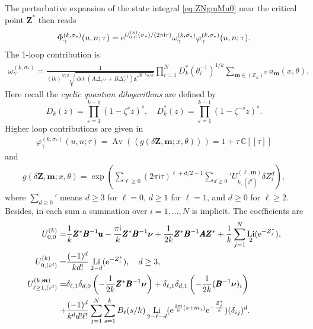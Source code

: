 \documentclass[a4paper,11pt]{article}	%
\DeclareMathOperator{\Li}{Li}
\newcommand{\bs}[1]{\boldsymbol{#1}}
\def\IC{\mathbb{C}}
\def\IZ{\mathbb{Z}}
\def\vev#1{\left\langle #1 \right\rangle}
\newcommand{\re}{{\rm e}}
\newcommand{\ri}{{\mathsf{i}}}
\newcommand{\nn}{\nonumber \\}
\begin{document}
The perturbative expansion of the state integral \eqref{eq:ZNgmMu0}
near the critical point $\pmb{Z}^*$ then reads
\begin{align}
  \Phi_\gamma^{(k,\sigma_*)}(u,n;\tau) = %
  \re^{U^{(k)}_{0,0}(\sigma_*)/(2\pi\ri\tau)}
  \omega_{\gamma}^{(k,\sigma_*)}\varphi_{\gamma}^{(k,\sigma_*)}(u,n;\tau).
  \label{eq:Zpert}
\end{align}
The 1-loop contribution is
\begin{align}
  \omega_{\gamma}^{(k,\sigma_*)} = \frac{1}
  {(\ri k)^{N/2}\sqrt{\det(A\Delta_{{z^*}''}+B\Delta_{z^*}^{-1})
  {\pmb{z}^*}^{\pmb{B}^{-1}\pmb{\nu}/k}
  }}
  \prod_{i=1}^N D_k^*(\theta_i^{-1})^{1/k} \sum_{\pmb{m}\in(\IZ_k)^N}
  a_{\pmb{m}}(x,\theta).
  \label{eq:omega}
\end{align}
Here recall the \emph{cyclic quantum dilogarithms} are defined by
\begin{equation}
  D_k(z) = \prod_{s=1}^{k-1}(1-\zeta^s z)^s,\quad
  D_{k}^*(z) = \prod_{s=1}^{k-1}(1-\zeta^{-s}z)^s.
\end{equation}
Higher loop contributions are given in
\begin{align}
  \varphi_{\gamma}^{(k,\sigma_*)}(u,n;\tau) =
  \mathop{\text{Av}}\left(
  \vev{
  g(\delta \pmb{Z},\pmb{m};x,\theta)
  }
  \right) = 1 + \tau \,\IC[[\tau]]
  \label{eq:varphi}
\end{align}
and
\begin{align}
  g(\delta \pmb{Z},\pmb{m};x,\theta) =
  \exp\left(
  \sum_{\ell\geq 0}(2\pi\ri\tau)^{\ell+d/2-1}
  {\sum_{d\geq  0}}'U_{k,(i^d)}^{(\ell,\pmb{m})}\delta Z_i^d\right),
\end{align}
where ${\sum_{d\geq 0}}'$ means $d\geq 3$ for $\ell=0$, $d\geq 1$ for
$\ell =1$, and $d\geq 0$ for $\ell\geq 2$.  Besides, in each sum a
summation over $i=1,\ldots,N$ is implicit.  The coefficients are
\begin{subequations}
  \begin{align}
    U^{(k)}_{0,0} =
    &\frac{1}{k}\pmb{Z}^*\pmb{B}^{-1}\pmb{u}
      -\frac{\pi\ri}{k}\pmb{Z}^*\pmb{B}^{-1}\bs\nu
      +\frac{1}{2k}\pmb{Z}^*\pmb{B}^{-1}\pmb{A}\pmb{Z}^*+
      \frac{1}{k}\sum_{j=1}^N\Li_2(\re^{-Z_j^*}),
      \label{eq:U00}
    \\
    U^{(k)}_{0,(i^d)} =
    &\frac{(-1)^d}{k d!}\Li_{2-d}(\re^{-Z_i^*}),\quad d\geq 3,\\
    U^{(k,\pmb{m})}_{\ell\geq 1,(i^d)} =
    &\delta_{\ell,1}\delta_{d,0}
      \left(-\frac{1}{2k}\pmb{Z}^*\pmb{B}^{-1}\bs\nu\right)
      +\delta_{\ell,1}\delta_{d,1}
      \left(-\frac{1}{2k}(\pmb{B}^{-1}\bs\nu)_i\right)\nn+
    &\frac{(-1)^d}{k^d d!\ell!}\sum_{j=1}^N\sum_{s=1}^k
      B_\ell(s/k)
      \Li_{2-\ell-d}(\re^{\frac{2\pi\ri}{k}(s+m_j)}\re^{-\frac{Z_j^*}{k}})
      (\delta_{ij})^d.
  \end{align}
\end{subequations}
\end{document}
